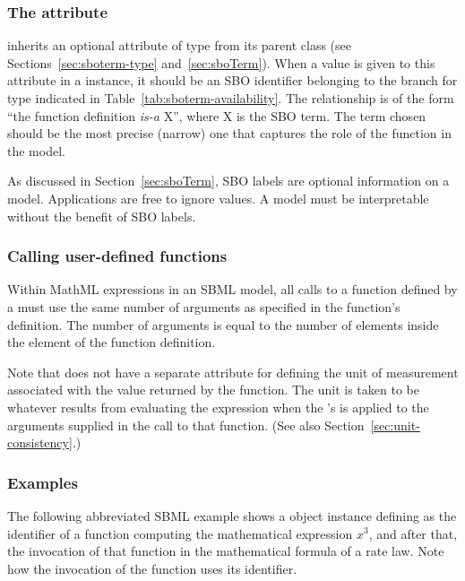 \subsubsection{The  attribute}
\label{sec:functiondefinition-sboterm}

\FunctionDefinition inherits an optional 
attribute of type  from its parent
class \SBase (see Sections~\ref{sec:sboterm-type}
and~\ref{sec:sboTerm}).  When a value is given to this
attribute in a \FunctionDefinition instance, it should be an
SBO identifier belonging to the branch for type \FunctionDefinition 
indicated in Table~\ref{tab:sboterm-availability}.  The relationship is
of the form ``the function definition \emph{is-a} X'', where X is
the SBO term.  The term chosen should be the most precise (narrow)
one that captures the role of the function in the model.

As discussed in Section~\ref{sec:sboTerm}, SBO labels are optional
information on a model.  Applications are free to ignore
 values.  A model must be interpretable without the
benefit of SBO labels.




\subsubsection{Calling user-defined functions}
\label{sec:functiondefinition-calling}

Within MathML expressions in an SBML model, all calls to a
function defined by a \FunctionDefinition must use the same number
of arguments as specified in the function's definition.  The
number of arguments is equal to the number of 
elements inside the  element of the function
definition.

Note that \FunctionDefinition does not have a separate attribute
for defining the unit of measurement associated with the value
returned by the function.  The unit is taken to be whatever
results from evaluating the expression when the
\FunctionDefinition's  is applied to the arguments
supplied in the call to that function.  (See also
Section~\ref{sec:unit-consistency}.)


\subsubsection{Examples}

The following abbreviated SBML example shows a \FunctionDefinition
object instance defining  as the identifier of a function
computing the mathematical expression $x^{3}$, and after that, the
invocation of that function in the mathematical formula of a rate
law.  Note how the invocation of the function uses its identifier.

